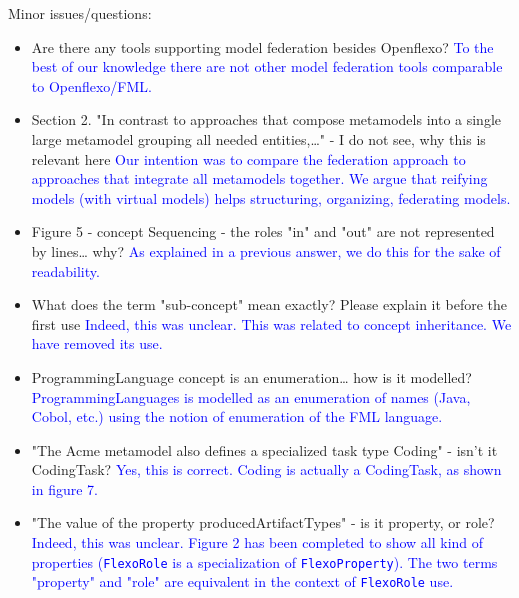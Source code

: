 \documentclass[10pt]{article}
\begin{document}
\begin{response}{Minor issues/questions:
\begin{itemize}
    \item Are there any tools supporting model federation besides Openflexo? \textcolor{blue}{To the best of our knowledge there are not other model federation tools comparable to Openflexo/FML.}
    \item Section 2. "In contrast to approaches that compose metamodels into a single large metamodel grouping all needed entities,…" - I do not see, why this is relevant here \textcolor{blue}{Our intention was to compare the federation approach to approaches that integrate all metamodels together. We argue that reifying models (with virtual models) helps structuring, organizing, federating models.}
    \item Figure 5 - concept Sequencing - the roles "in" and "out" are not represented by lines… why? \textcolor{blue}{As explained in a previous answer, we do this for the sake of readability.}
    \item What does the term "sub-concept" mean exactly? Please explain it before the first use \textcolor{blue}{Indeed, this was unclear. This was related to concept inheritance. We have removed its use.}
    \item ProgrammingLanguage concept is an enumeration… how is it modelled? \textcolor{blue}{ProgrammingLanguages is modelled as an enumeration of names (Java, Cobol, etc.) using the notion of enumeration of the FML language. }
    \item "The Acme metamodel also defines a specialized task type Coding" - isn’t it CodingTask? \textcolor{blue}{Yes, this is correct. Coding is actually a CodingTask, as shown in figure 7.}
    \item "The value of the property producedArtifactTypes" - is it property, or role? \textcolor{blue}{Indeed, this was unclear. Figure 2 has been completed to show all kind of properties (\texttt{FlexoRole} is a specialization of \texttt{FlexoProperty}). The two terms "property" and "role" are equivalent in the context of \texttt{FlexoRole} use.}
\end{itemize}}







\end{response}
\end{document}
